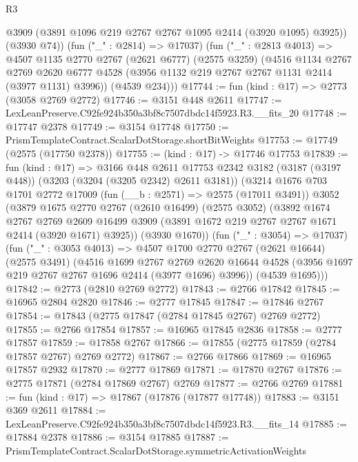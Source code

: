 \begin{lexlean}{R3}
\begin{coremodule}
          @3909
          (@3891 @1096 @219 @2767 @2767 @1095 @2414 (@3920 @1095) @3925))
        (@3930 @74))
      (fun ("_" : @2814) => @17037)
      (fun ("_" : @2813 @4013) =>
      @4507
        @1135
        @2770
        @2767
        (@2621 @6777)
        (@2575 @3259)
        (@4516
          @1134
          @2767
          @2769
          @2620
          @6777
          @4528
          (@3956 @1132 @219 @2767 @2767 @1131 @2414 (@3977 @1131) @3996))
        (@4539 @234)))
@17744 := fun (kind : @17) => @2773 (@3058 @2769 @2772)
@17746 := @3151 @448 @2611
@17747 := LexLeanPreserve.C92fe924b350a3bf8c7507dbdc14f5923.R3.__fits_20
@17748 := @17747 @2378
@17749 := @3154 @17748
@17750 := PrismTemplateContract.ScalarDotStorage.shortBitWeights
@17753 := @17749 (@2575 (@17750 @2378))
@17755 := (kind : @17) -> @17746 @17753
@17839 := fun (kind : @17) =>
  @3166
    @448
    @2611
    @17753
    @2342
    @3182
    (@3187 (@3197 @448))
    (@3203 (@3204 (@3205 @2342) @2611 @3181))
    (@3214
      @1676
      @703
      @1701
      @2772
      @17009
      (fun (__b : @2571) => @2575 (@17011 @3491))
      @3052
      (@3879
        @1675
        @2770
        @2767
        (@2610 @16499)
        (@2575 @3052)
        (@3892
          @1674
          @2767
          @2769
          @2609
          @16499
          @3909
          (@3891 @1672 @219 @2767 @2767 @1671 @2414 (@3920 @1671) @3925))
        (@3930 @1670))
      (fun ("_" : @3054) => @17037)
      (fun ("_" : @3053 @4013) =>
      @4507
        @1700
        @2770
        @2767
        (@2621 @16644)
        (@2575 @3491)
        (@4516
          @1699
          @2767
          @2769
          @2620
          @16644
          @4528
          (@3956 @1697 @219 @2767 @2767 @1696 @2414 (@3977 @1696) @3996))
        (@4539 @1695)))
@17842 := @2773 (@2810 @2769 @2772)
@17843 := @2766 @17842
@17845 := @16965 @2804 @2820
@17846 := @2777 @17845
@17847 := @17846 @2767
@17854 := @17843 (@2775 @17847 (@2784 @17845 @2767) @2769 @2772)
@17855 := @2766 @17854
@17857 := @16965 @17845 @2836
@17858 := @2777 @17857
@17859 := @17858 @2767
@17866 := @17855 (@2775 @17859 (@2784 @17857 @2767) @2769 @2772)
@17867 := @2766 @17866
@17869 := @16965 @17857 @2932
@17870 := @2777 @17869
@17871 := @17870 @2767
@17876 := @2775 @17871 (@2784 @17869 @2767) @2769
@17877 := @2766 @2769
@17881 := fun (kind : @17) => @17867 (@17876 (@17877 @17748))
@17883 := @3151 @369 @2611
@17884 := LexLeanPreserve.C92fe924b350a3bf8c7507dbdc14f5923.R3.__fits_14
@17885 := @17884 @2378
@17886 := @3154 @17885
@17887 := PrismTemplateContract.ScalarDotStorage.symmetricActivationWeights

\end{coremodule}
\end{lexlean}
